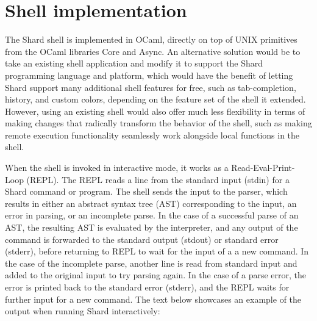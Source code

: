 \documentclass[oneside]{report}
\begin{document}
\section{Shell implementation}


The Shard shell is implemented in OCaml, directly on top of UNIX primitives from the OCaml libraries Core and Async.
An alternative solution would be to take an existing shell application and modify it to support the Shard programming language and platform, which would have the benefit of letting Shard support many additional shell features for free, such as tab-completion, history, and custom colors, depending on the feature set of the shell it extended.
However, using an existing shell would also offer much less flexibility in terms of making changes that radically transform the behavior of the shell, such as making remote execution functionality seamlessly work alongside local functions in the shell.

When the shell is invoked in interactive mode, it works as a Read-Eval-Print-Loop (REPL). The REPL reads a line from the standard input (stdin) for a Shard command or program. The shell sends the input to the parser, which results in either an abstract syntax tree (AST) corresponding to the input, an error in parsing, or an incomplete parse.
In the case of a successful parse of an AST, the resulting AST is evaluated by the interpreter, and any output of the command is forwarded to the standard output (stdout) or standard error (stderr), before returning to REPL to wait for the input of a a new command.
In the case of the incomplete parse, another line is read from standard input and added to the original input to try parsing again.
In the case of a parse error, the error is printed back to the standard error (stderr), and the REPL waits for further input for a new command.
The text below showcases an example of the output when running Shard interactively:
\end{document}
